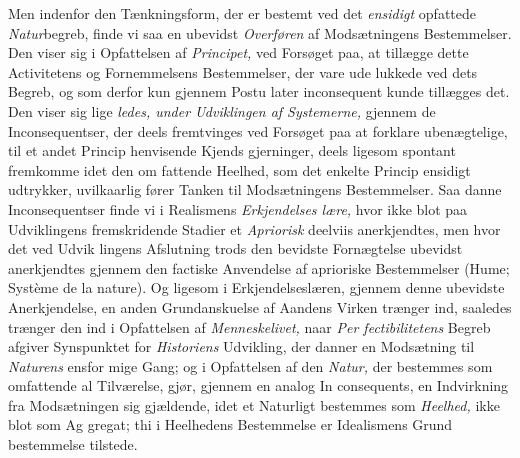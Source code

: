 Men indenfor den Tænkningsform, der er bestemt ved det
\emph{ensidigt} opfattede \emph{Natur}begreb, finde vi saa en ubevidst
\emph{Overføren} af Modsætningens Bestemmelser. Den viser sig i
Opfattelsen af \emph{Principet,} ved Forsøget paa, at tillægge dette
Activitetens og Fornemmelsens Bestemmelser, der vare ude\-%
lukkede ved dets Begreb, og som derfor kun gjennem Postu\-%
later inconsequent kunde tillægges det. Den viser sig lige\-%
\emph{ledes, under Udviklingen af Systemerne,} gjennem
de Inconsequentser, der deels fremtvinges ved Forsøget paa at
forklare ubenægtelige, til et andet Princip henvisende Kjends\-%
gjerninger, deels ligesom spontant fremkomme idet den om\-%
fattende Heelhed, som det enkelte Princip ensidigt udtrykker,
uvilkaarlig fører Tanken til Modsætningens Bestemmelser. Saa\-%
danne Inconsequentser finde vi i Realismens \emph{Erkjendelses\-%
lære,} hvor ikke blot paa Udviklingens fremskridende Stadier
et \emph{Apriorisk} deelviis anerkjendtes, men hvor det ved Udvik\-%
lingens Afslutning trods den bevidste Fornægtelse ubevidst
anerkjendtes gjennem den factiske Anvendelse af aprioriske
Bestemmelser (Hume; Système de la nature). Og ligesom i
Erkjendelseslæren, gjennem denne ubevidste Anerkjendelse, en
anden Grundanskuelse af Aandens Virken trænger ind, saaledes
trænger den ind i Opfattelsen af \emph{Menneskelivet,} naar \emph{Per\-%
fectibilitetens} Begreb afgiver Synspunktet for \emph{Historiens}
Udvikling, der danner en Modsætning til \emph{Naturens} ensfor\-%
mige Gang; og i Opfattelsen af den \emph{Natur,} der bestemmes
som omfattende al Tilværelse, gjør, gjennem en analog In\-%
consequents, en Indvirkning fra Modsætningen sig gjældende,
idet et Naturligt bestemmes som \emph{Heelhed,} ikke blot som Ag\-%
gregat; thi i Heelhedens Bestemmelse er Idealismens Grund\-%
bestemmelse tilstede.

